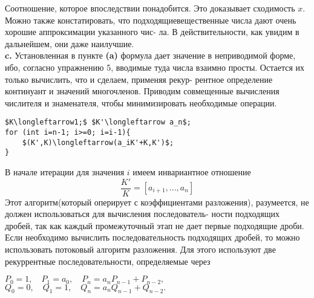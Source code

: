 \noindent Соотношение, которое впоследствии понадобится. Это доказывает\linebreak 
схо­димость $x$. Можно также констатировать, что подходящие\linebreak веществен­ные числа дают очень хорошие аппроксимации указанного чис-\linebreak
ла. В действительности, как увидим в дальнейшем, они даже наилучшие.\newline
\\
\hspace*{15pt}\textbf{c.} Установленная в пункте \textbf{(a)} формула дает значение в неприводи­мой\linebreak 
форме, ибо, согласно упражнению 5, вводимые туда числа взаимно\linebreak
просты. Остается их только вычислить, что и сделаем, применяя рекур­-\linebreak
рентное определение континуант и значений многочленов. Приводим\linebreak
совмещенные вычисления числителя и знаменателя, чтобы\linebreak 
минимизи­ровать необходимые операции.
\begin{lstlisting}[mathescape=true]
$K\longleftarrow1;$ $K'\longleftarrow a_n$;
for (int i=n-1; i>=0; i=i-1){
	$(K',K)\longleftarrow(a_iK'+K,K')$;
}
\end{lstlisting}
В начале итерации для значения $i$ имеем инвариантное отношение
$$ \frac{K'}{K}=[a_{i+1},...,a_n] $$
\newpage
%
%
\noindent Этот алгоритм(который оперирует с коэффициентами разложения),\linebreak
разумеется, не должен использоваться для вычисления последователь-­\linebreak
ности подходящих дробей, так как каждый промежуточный этап не\linebreak
дает первые подходящие дроби.\newline
\hspace*{15pt}Если необходимо вычислить последовательность подходящих дро­бей,\linebreak
то можно использовать потоковый алгоритм разложения. Для это­го \linebreak
используют две рекуррентные последовательности, определяемые через\nolinebreak
\begin{center}
	$P_0=1,\quad P_1=a_0,\quad P_n=a_nP_{n-1}+P_{n-2},$\\
	$Q_0=0,\quad Q_1=1,\quad Q_n=a_nQ_{n-1}+Q_{n-2}.$
\end{center}

